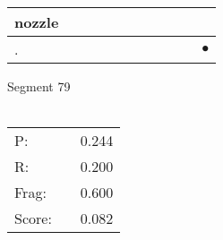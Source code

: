 \documentclass[landscape]{article}
\newcommand{\ssp}{\hspace{2pt}}
\newcommand{\mex}{\cellcolor{g}$\bullet$}
\begin{document}
\begin{tabular}{|l|p{10pt}|p{10pt}|p{10pt}|p{10pt}|p{10pt}|p{10pt}|p{10pt}|p{10pt}|p{10pt}|p{10pt}|}
\hline
\ssp nozzle \ssp&\hspace{2pt}&\hspace{2pt}&\hspace{2pt}&\hspace{2pt}&\hspace{2pt}&\hspace{2pt}&\hspace{2pt}&\hspace{2pt}&\hspace{2pt}&\hspace{2pt}\\
\hline
\ssp \cellcolor{ref9}. \ssp&\hspace{2pt}&\hspace{2pt}&\hspace{2pt}&\hspace{2pt}&\hspace{2pt}&\hspace{2pt}&\hspace{2pt}&\hspace{2pt}&\hspace{2pt}&\hspace{2pt}\mex\\
\hline
\end{tabular}

\vspace{6pt}
\noindent Segment 79\\\\
\noindent\begin{tabular}{lm{12pt}r}
\hline
P:&&0.244\\
R:&&0.200\\
Frag:&&0.600\\
Score:&&0.082\\
\end{tabular}

\newpage
\end{document}
